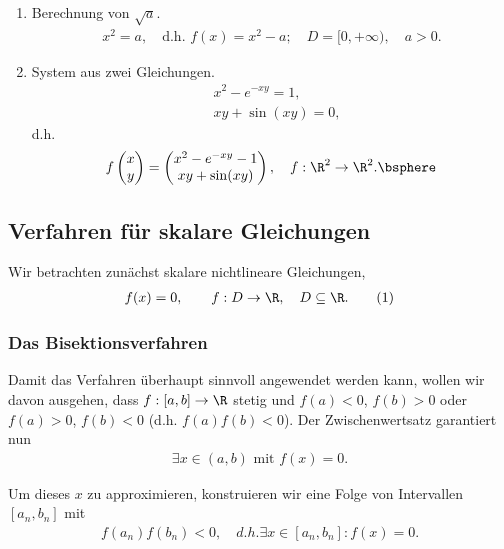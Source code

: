 \begin{bspn}
\begin{enumerate}[label=(\roman{*})]
  \item Berechnung von $\sqrt{a}$.
\begin{align*}
x^2 = a, \quad \text{d.h. } f(x) = x^2 -a;\quad D=[0,+\infty),\quad a > 0.
\end{align*}
\item System aus zwei Gleichungen.
\begin{align*}
&x^2 - e^{-xy} = 1,\\
&xy + \sin (xy) = 0,
\end{align*}
d.h.
\begin{align*}
f\begin{pmatrix}x\\y\end{pmatrix} =
\begin{pmatrix}
x^2 - e^{-xy} - 1\\
xy + \sin (xy)
\end{pmatrix},
\quad f: \R^2 \to \R^2. \bsphere
\end{align*}
\end{enumerate}
\end{bspn}

\subsection{Verfahren für skalare Gleichungen}

Wir betrachten zunächst skalare nichtlineare Gleichungen,
\begin{align*}
f(x) = 0,\qquad f:D\to\R,\quad D\subseteq \R. \tag{1}
\end{align*}

\subsubsection{Das Bisektionsverfahren}

Damit das Verfahren überhaupt sinnvoll angewendet werden kann, wollen wir davon
ausgehen, dass $f:[a,b]\to\R$ stetig und $f(a)<0$, $f(b) > 0$ oder $f(a)>0$,
$f(b)<0$ (d.h. $f(a)f(b) < 0$). Der Zwischenwertsatz garantiert nun
\begin{align*}
\exists x\in(a,b)\text{ mit }f(x) = 0.
\end{align*}

Um dieses $x$ zu approximieren, konstruieren wir eine Folge von Intervallen
$[a_n,b_n]$ mit
\begin{align*}
f(a_n)f(b_n) < 0,\quad d.h. \exists x \in [a_n,b_n] : f(x) = 0.
\end{align*}

